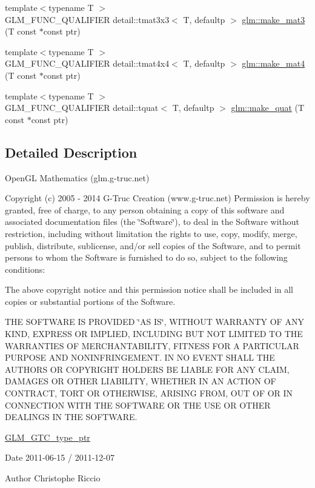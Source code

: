 \begin{DoxyCompactItemize}
\item 
{\footnotesize template$<$typename T $>$ }\\G\+L\+M\+\_\+\+F\+U\+N\+C\+\_\+\+Q\+U\+A\+L\+I\+F\+I\+ER detail\+::tmat3x3$<$ T, defaultp $>$ \hyperlink{group__gtc__type__ptr_gae50ecac46eb8771fb074e310b602bf53}{glm\+::make\+\_\+mat3} (T const $\ast$const ptr)
\item 
{\footnotesize template$<$typename T $>$ }\\G\+L\+M\+\_\+\+F\+U\+N\+C\+\_\+\+Q\+U\+A\+L\+I\+F\+I\+ER detail\+::tmat4x4$<$ T, defaultp $>$ \hyperlink{group__gtc__type__ptr_gac3920fd61f0c459a4749b8eb9107982c}{glm\+::make\+\_\+mat4} (T const $\ast$const ptr)
\item 
{\footnotesize template$<$typename T $>$ }\\G\+L\+M\+\_\+\+F\+U\+N\+C\+\_\+\+Q\+U\+A\+L\+I\+F\+I\+ER detail\+::tquat$<$ T, defaultp $>$ \hyperlink{group__gtc__type__ptr_ga051ec24a44af31a08b11eccbf8726b02}{glm\+::make\+\_\+quat} (T const $\ast$const ptr)
\end{DoxyCompactItemize}


\subsection{Detailed Description}
Open\+GL Mathematics (glm.\+g-\/truc.\+net)

Copyright (c) 2005 -\/ 2014 G-\/\+Truc Creation (www.\+g-\/truc.\+net) Permission is hereby granted, free of charge, to any person obtaining a copy of this software and associated documentation files (the \char`\"{}\+Software\char`\"{}), to deal in the Software without restriction, including without limitation the rights to use, copy, modify, merge, publish, distribute, sublicense, and/or sell copies of the Software, and to permit persons to whom the Software is furnished to do so, subject to the following conditions\+:

The above copyright notice and this permission notice shall be included in all copies or substantial portions of the Software.

T\+HE S\+O\+F\+T\+W\+A\+RE IS P\+R\+O\+V\+I\+D\+ED \char`\"{}\+A\+S I\+S\char`\"{}, W\+I\+T\+H\+O\+UT W\+A\+R\+R\+A\+N\+TY OF A\+NY K\+I\+ND, E\+X\+P\+R\+E\+SS OR I\+M\+P\+L\+I\+ED, I\+N\+C\+L\+U\+D\+I\+NG B\+UT N\+OT L\+I\+M\+I\+T\+ED TO T\+HE W\+A\+R\+R\+A\+N\+T\+I\+ES OF M\+E\+R\+C\+H\+A\+N\+T\+A\+B\+I\+L\+I\+TY, F\+I\+T\+N\+E\+SS F\+OR A P\+A\+R\+T\+I\+C\+U\+L\+AR P\+U\+R\+P\+O\+SE A\+ND N\+O\+N\+I\+N\+F\+R\+I\+N\+G\+E\+M\+E\+NT. IN NO E\+V\+E\+NT S\+H\+A\+LL T\+HE A\+U\+T\+H\+O\+RS OR C\+O\+P\+Y\+R\+I\+G\+HT H\+O\+L\+D\+E\+RS BE L\+I\+A\+B\+LE F\+OR A\+NY C\+L\+A\+IM, D\+A\+M\+A\+G\+ES OR O\+T\+H\+ER L\+I\+A\+B\+I\+L\+I\+TY, W\+H\+E\+T\+H\+ER IN AN A\+C\+T\+I\+ON OF C\+O\+N\+T\+R\+A\+CT, T\+O\+RT OR O\+T\+H\+E\+R\+W\+I\+SE, A\+R\+I\+S\+I\+NG F\+R\+OM, O\+UT OF OR IN C\+O\+N\+N\+E\+C\+T\+I\+ON W\+I\+TH T\+HE S\+O\+F\+T\+W\+A\+RE OR T\+HE U\+SE OR O\+T\+H\+ER D\+E\+A\+L\+I\+N\+GS IN T\+HE S\+O\+F\+T\+W\+A\+RE.

\hyperlink{group__gtc__type__ptr}{G\+L\+M\+\_\+\+G\+T\+C\+\_\+type\+\_\+ptr}

\begin{DoxyDate}{Date}
2011-\/06-\/15 / 2011-\/12-\/07 
\end{DoxyDate}
\begin{DoxyAuthor}{Author}
Christophe Riccio 
\end{DoxyAuthor}
